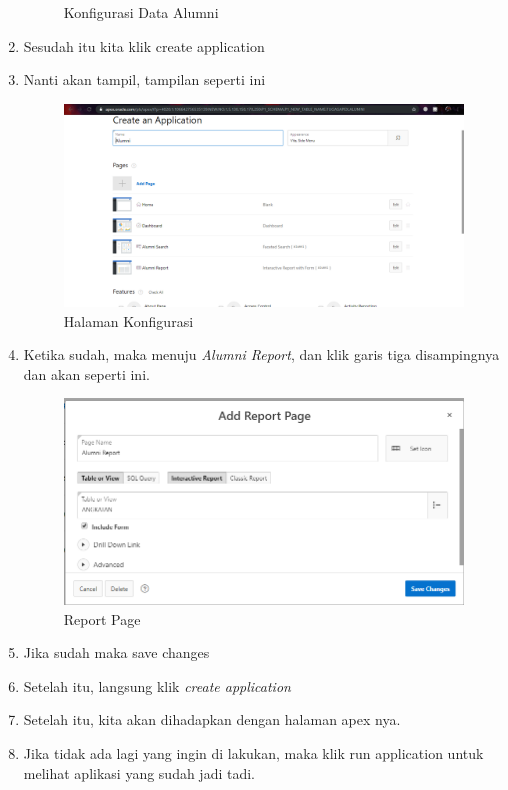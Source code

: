 \documentclass{article}
\begin{document}
\begin{enumerate}
\begin{figure}[!htbp]
        \caption{Konfigurasi Data Alumni}
    \end{figure}
\newpage
    \item Sesudah itu kita klik create application
    \item Nanti akan tampil, tampilan seperti ini
    \begin{figure}[!htbp]
        \centering
        \includegraphics[scale=0.3]{17.PNG}
        \caption{Halaman Konfigurasi}
    \end{figure}
    \item Ketika sudah, maka menuju \textit{Alumni Report}, dan klik garis tiga disampingnya dan akan seperti ini.
    \begin{figure}[!htbp]
        \centering
        \includegraphics[scale=0.5]{18.PNG}
        \caption{Report Page}
    \end{figure}
    \item Jika sudah maka save changes
    \item Setelah itu, langsung klik \textit{create application}
\newpage
    \item Setelah itu, kita akan dihadapkan dengan halaman apex nya.
    \item Jika tidak ada lagi yang ingin di lakukan, maka klik run application untuk melihat aplikasi yang sudah jadi tadi.

\end{enumerate}
\end{document}
